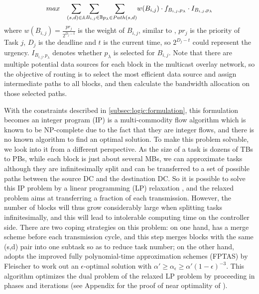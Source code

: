 \begin{equation}
\centering
max \quad \displaystyle{\sum_{(s,d)\in \mathbb{A}}} \displaystyle{\sum_{B_{i,j} \in \mathbb{B}}} \displaystyle{\sum_{p_{\lambda}\in Path(s,d)}} w(B_{i,j})\cdot f_{B_{i,j},p_\lambda} \cdot I_{B_{i,j},p_\lambda}
\end{equation}
where $w(B_{i,j}) = \frac{pr_j}{2^{D_j-t}}$ is the weight of $B_{i,j}$, similar to \cite{zhang2015guaranteeing}, $pr_j$ is the priority of Task $j$, $D_j$ is the deadline and $t$ is the current time, so $2^{D_j-t}$ could represent the urgency. $I_{B_{i,j},p_\lambda}$ denotes whether $p_\lambda$ is selected for $B_{i,j}$. Note that there are multiple potential data sources for each block in the multicast overlay network, so the objective of routing is to select the most efficient data source and assign intermediate paths to all blocks, and then calculate the bandwidth allocation on those selected paths.

With the constraints described in \Section\ref{subsec:logic:formulation}, this formulation becomes an integer program (IP) is a multi-commodity flow algorithm which is known to be NP-complete \cite{garg1997primal} due to the fact that they are integer flows, and there is no known algorithm to find an optimal solution. To make this problem solvable, we look into it from a different perspective. As the size of a task is dozens of TBs to PBs, while each block is just about several MBs, we can approximate tasks although they are infinitesimally split and can be transferred to a set of possible paths between the source DC and the destination DC. So it is possible to solve this IP problem by a linear programming (LP) relaxation \cite{garg2007faster,reed2012traffic}, and the relaxed problem aims at transferring a fraction of each transmission. However, the number of blocks will thus grow considerably large when splitting tasks infinitesimally, and this will lead to intolerable computing time on the controller side. There are two coping strategies on this problem: on one hand, \name has a merge scheme before each transmission cycle, and this step merges blocks with the same (s,d) pair into one subtask so as to reduce task number; on the other hand, \name adopts the improved fully polynomial-time approximation schemes (FPTAS) by Fleischer \cite{fleischer2000approximating} to work out an $\epsilon$-optimal solution with $\alpha' \geq \alpha_\epsilon \geq \alpha'(1-\epsilon)^{-3}$. This algorithm optimizes the dual problem of the relaxed LP problem by proceeding in phases and iterations (see Appendix for the proof of near optimality of \name).
